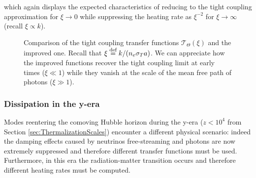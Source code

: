 which again displays the expected characteristics of reducing to the tight coupling approximation for $\xi\to0$ while suppressing the heating rate as $\xi^{-2}$ for $\xi\to\infty$ (recall $\xi\propto k$).
\begin{figure}
\centering
{}
\caption{Comparison of the tight coupling transfer functions $\mathcal{T}_\Theta(\xi)$ and the improved one. Recall that $\xi \stackrel{\text{def}}{=} k/(n_e\sigma_T a)$. We can appreciate how the improved functions recover the tight coupling limit at early times ($\xi\ll1$) while they vanish at the scale of the mean free path of photons ($\xi\gg1$).}
\label{fig:fight_coupling}
\end{figure}
\subsubsection{Dissipation in the y-era}
Modes reentering the comoving Hubble horizon during the y-era ($z<10^4$ from Section \ref{sec:ThermalizationScales}) encounter a different physical scenario: indeed the damping effects caused by neutrinos free-streaming and photons are now extremely suppressed and therefore different transfer functions must be used. Furthermore, in this era the radiation-matter transition occurs and therefore different heating rates must be computed. 

